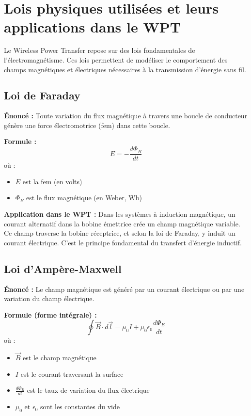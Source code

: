 \documentclass[12pt,a4paper,titlepage,notitlepage]{article}
\begin{document}
	
	
	
	
	\section{Lois physiques utilisées et leurs applications dans le WPT}
	Le Wireless Power Transfer repose sur des lois fondamentales de l’électromagnétisme. Ces lois permettent de modéliser le comportement des champs magnétiques et électriques nécessaires à la transmission d’énergie sans fil.
	
	\subsection{Loi de Faraday}
	\textbf{Énoncé :} Toute variation du flux magnétique à travers une boucle de conducteur génère une force électromotrice (fem) dans cette boucle.
	
	\textbf{Formule :}
	\[
	E = -\frac{d\Phi_B}{dt}
	\]
	où :
	\begin{itemize}
		\item \(E\) est la fem (en volts)
		\item \(\Phi_B\) est le flux magnétique (en Weber, Wb)
	\end{itemize}
	
	\textbf{Application dans le WPT :} Dans les systèmes à induction magnétique, un courant alternatif dans la bobine émettrice crée un champ magnétique variable. Ce champ traverse la bobine réceptrice, et selon la loi de Faraday, y induit un courant électrique. C’est le principe fondamental du transfert d’énergie inductif.
	
	\subsection{Loi d’Ampère-Maxwell}
	\textbf{Énoncé :} Le champ magnétique est généré par un courant électrique ou par une variation du champ électrique.
	
	\textbf{Formule (forme intégrale) :}
	\[
	\oint \vec{B} \cdot d\vec{l} = \mu_0 I + \mu_0 \epsilon_0 \frac{d\Phi_E}{dt}
	\]
	où :
	\begin{itemize}
		\item \(\vec{B}\) est le champ magnétique
		\item \(I\) est le courant traversant la surface
		\item \(\frac{d\Phi_E}{dt}\) est le taux de variation du flux électrique
		\item \(\mu_0\) et \(\epsilon_0\) sont les constantes du vide
	\end{itemize}
	
\end{document}
